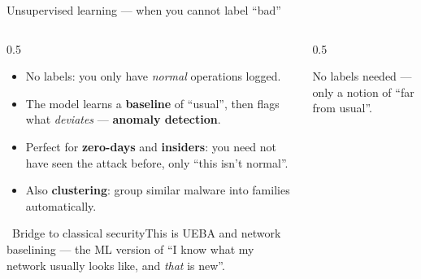 \documentclass[aspectratio=169,10pt]{beamer}
\newcommand{\term}[1]{{\color{mlink}\textbf{#1}}}         %
\newcommand{\mlterm}[1]{{\color{accent}\textsf{\textbf{#1}}}} %
\newcommand{\bridge}[1]{%
  \begin{block}{\small\ding{43}\ Bridge to classical security}\small #1\end{block}}
\begin{document}
\begin{frame}{Unsupervised learning --- when you cannot label ``bad''}
  \begin{columns}[T]
    \begin{column}{0.5\textwidth}
      \begin{itemize}
        \item No labels: you only have \emph{normal} operations logged.
        \item The model learns a \term{baseline} of ``usual'', then flags what
              \emph{deviates} --- \mlterm{anomaly detection}.
        \item Perfect for \term{zero-days} and \term{insiders}: you need not have
              seen the attack before, only ``this isn't normal''.
        \item Also \mlterm{clustering}: group similar malware into families
              automatically.
      \end{itemize}
      \bridge{This is UEBA and network baselining --- the ML version of ``I know
      what my network usually looks like, and \emph{that} is new''.}
    \end{column}
    \begin{column}{0.5\textwidth}
      \centering
      \par\vspace{0.3em}
      {\footnotesize\color{midgray}No labels needed --- only a notion of ``far
      from usual''.}
    \end{column}
  \end{columns}
\end{frame}
\end{document}
